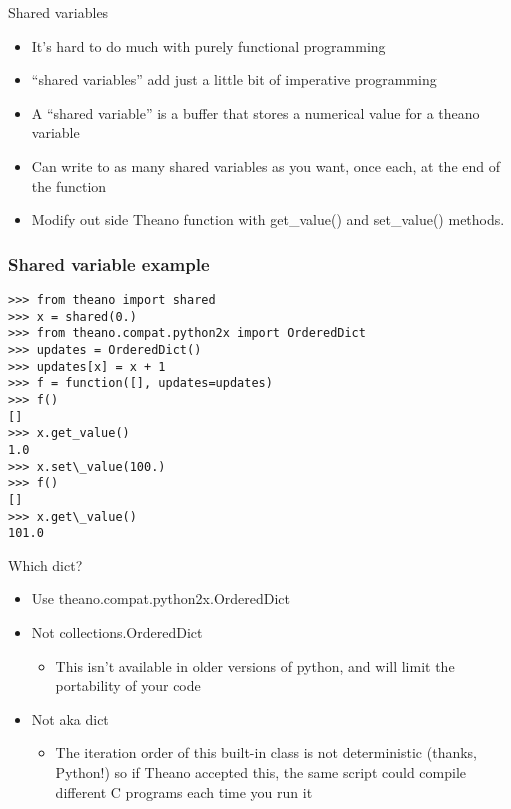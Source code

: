 \documentclass[utf8x,xcolor=pdftex,dvipsnames,table]{beamer}
\begin{document}
\begin{frame}{Shared variables}  
  \begin{itemize}
  \item It’s hard to do much with purely functional programming
  \item ``shared variables'' add just a little bit of imperative programming
  \item A “shared variable” is a buffer that stores a numerical value for a theano variable
  \item Can write to as many shared variables as you want, once each, at the end of the function
  \item  Modify out side Theano function with get\_value() and set\_value() methods.
  \end{itemize}
\end{frame}

\begin{frame}[fragile]
  \frametitle{Shared variable example}

\begin{lstlisting}
>>> from theano import shared
>>> x = shared(0.)
>>> from theano.compat.python2x import OrderedDict
>>> updates = OrderedDict()
>>> updates[x] = x + 1
>>> f = function([], updates=updates)
>>> f()
[]
>>> x.get_value()
1.0
>>> x.set\_value(100.)
>>> f()
[]
>>> x.get\_value()
101.0
\end{lstlisting}
\end{frame}

\begin{frame}{Which dict?}
  \begin{itemize}
  \item Use theano.compat.python2x.OrderedDict
  \item Not collections.OrderedDict
  \begin{itemize}
  \item This isn’t available in older versions of python,
and will limit the portability of your code
  \end{itemize}
  \item Not {} aka dict
  \begin{itemize}
  \item The iteration order of this built-in class is not
    deterministic (thanks, Python!) so if Theano
    accepted this, the same script could compile
    different C programs each time you run it
  \end{itemize}
  \end{itemize}
\end{frame}
\end{document}
